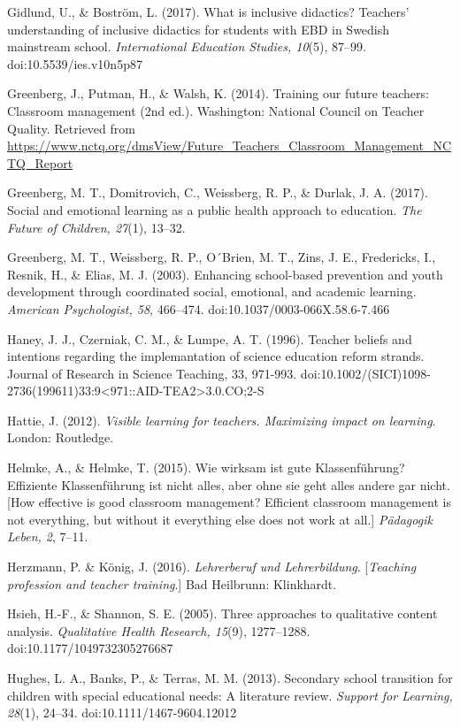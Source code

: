 \documentclass[11.5pt]{sig-alternate} %
\begin{document}
Gidlund, U., \& Boström, L. (2017). What is inclusive didactics? Teachers’ understanding of inclusive didactics for students with EBD in Swedish mainstream school. \textit{International Education Studies, 10}(5), 87–99. doi:10.5539/\-ies.v10n5p87

Greenberg, J., Putman, H., \& Walsh, K. (2014). Training our future teachers: Classroom management (2nd ed.). Washington: National Council on Teacher Quality. Retrieved from \url{https://www.nctq.org/dmsView/Future_Teachers_Classroom_Management_NCTQ_Report}

Greenberg, M. T., Domitrovich, C., Weissberg, R. P., \& Durlak, J. A. (2017). Social and emotional learning as a public health approach to education. \textit{The Future of Children, 27}(1), 13–32.

Greenberg, M. T., Weissberg, R. P., O´Brien, M. T., Zins, J. E., Fredericks, I., Resnik, H., \& Elias, M. J. (2003). Enhancing school-based prevention and youth development through coordinated social, emotional, and academic learning. \textit{American Psychologist, 58}, 466–474. doi:10.1037/0003-066X.58.6-7.466

Haney, J. J., Czerniak, C. M., \& Lumpe, A. T. (1996). Teacher beliefs and intentions regarding the implemantation of science education reform strands. Journal of Research in Science Teaching, 33, 971-993. doi:10.1002/\-(SICI)1098-2736(199611)33:9<971::AID-TEA2>3.0.CO;2-S

Hattie, J. (2012). \textit{Visible learning for teachers. Maximizing impact on learning}. London: Routledge.

Helmke, A., \& Helmke, T. (2015). Wie wirksam ist gute Klassenführung? Effiziente Klassenführung ist nicht alles, aber ohne sie geht alles andere gar nicht. [How effective is good classroom management? Efficient classroom management is not everything, but without it everything else does not work at all.] \textit{Pädagogik Leben, 2}, 7–11.

Herzmann, P. \& König, J. (2016). \textit{Lehrerberuf und Lehrerbildung}. [\textit{Teaching profession and teacher training}.] Bad Heilbrunn: Klinkhardt.

Hsieh, H.-F., \& Shannon, S. E. (2005). Three approaches to qualitative content analysis. \textit{Qualitative Health Research, 15}(9), 1277–1288. doi:10.1177/1049732305276687

Hughes, L. A., Banks, P., \& Terras, M. M. (2013). Secondary school transition for children with special educational needs: A literature review. \textit{Support for Learning, 28}(1), 24–34. doi:10.1111/1467-9604.12012
\end{document}
